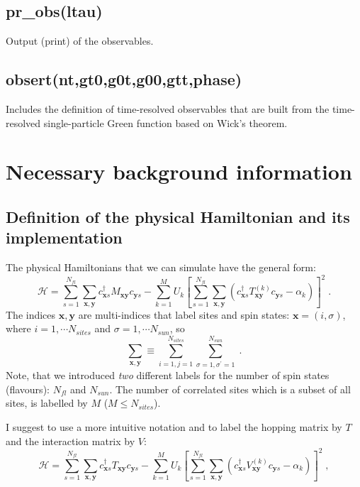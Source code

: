 \documentclass[10pt,Arial]{article}
\begin{document}
\subsection{pr\_obs(ltau)}
Output (print) of the observables.

\subsection{obsert(nt,gt0,g0t,g00,gtt,phase)}
Includes the definition of time-resolved observables that are built from the time-resolved single-particle Green function based on 
Wick's theorem.

\section{Necessary background information}

\subsection{Definition of the physical Hamiltonian and its implementation}

The physical Hamiltonians that we can simulate have the general form:
\begin{equation}
\label{eqn_general_ham1}
\mathcal{H}
=\sum\limits_{s=1}^{N_{fl}}\sum\limits_{\bm{x},\bm{y}}
c^{\dagger}_{\bm{x} s}M_{\bm{x}\bm{y}}c^{\phantom\dagger}_{\bm{y}s}
-\sum\limits_{k=1}^{M}U_{k}\left[
\sum\limits_{s=1}^{N_{fl}}\sum\limits_{\bm{x},\bm{y}}
\left( 
c^{\dagger}_{\bm{x}s}T^{(k)}_{\bm{x}\bm{y}}c^{\phantom\dagger}_{\bm{y}s}-\alpha_{k}
\right)
\right]^{2}\;.
\end{equation}
The indices $\bm{x},\bm{y}$ are multi-indices that label sites and spin states: $\bm{x}=(i,\sigma)$, 
where $i=1,\cdots N_{sites}$ and $\sigma=1,\cdots N_{sun}$, so
\begin{equation}
\sum\limits_{\bm{x},\bm{y}}\equiv
\sum\limits_{i=1,j=1}^{N_{sites}}\sum\limits_{\sigma=1,\sigma^{\prime}=1}^{N_{sun}}\;.
\end{equation}
Note, that  we introduced \textit{two} different labels for the number of spin states (flavours): 
$N_{fl}$ and $N_{sun}$.
The number of correlated sites which is a subset of all sites, is labelled by $M$  ($M\leq N_{sites}$).

I suggest to use a more intuitive notation and to label the hopping matrix by $T$ and the interaction matrix by $V$:
\begin{equation}
\label{eqn_general_ham2}
\mathcal{H}
=\sum\limits_{s=1}^{N_{fl}}\sum\limits_{\bm{x},\bm{y}}
c^{\dagger}_{\bm{x}s}T_{\bm{x}\bm{y}}c^{\phantom\dagger}_{\bm{y}s}
-\sum\limits_{k=1}^{M}U_{k}\left[
\sum\limits_{s=1}^{N_{fl}}\sum\limits_{\bm{x},\bm{y}}
\left( 
c^{\dagger}_{\bm{x}s}V^{(k)}_{\bm{x}\bm{y}}c^{\phantom\dagger}_{\bm{y} s}-\alpha_{k}
\right)
\right]^{2}\;,
\end{equation}
\end{document}
